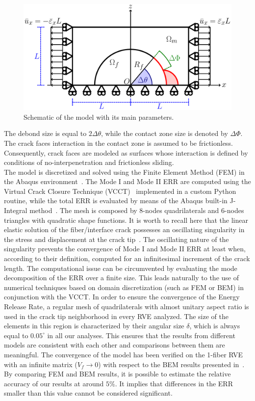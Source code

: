 \begin{figure}[!htb]
\centering
  \includegraphics[width=\textwidth]{paperD/RUC.pdf}
\caption{Schematic of the model with its main parameters.}\label{paperD:fig:ruc}
\end{figure}

The debond size is equal to $2\Delta\theta$, while the contact zone size is denoted by $\Delta\Phi$. The crack faces interaction in the contact zone is assumed to be frictionless. Consequently, crack faces are modeled as surfaces whose interaction is defined by conditions of no-interpenetration and frictionless sliding.\\
The model is discretized and solved using the Finite Element Method (FEM) in the Abaqus environment~\cite{abq12}. The Mode I and Mode II ERR are computed using the Virtual Crack Closure Technique (VCCT)~\cite{Krueger2004} implemented in a custom Python routine, while the total ERR is evaluated by means of the Abaqus built-in J-Integral method~\cite{Rice1968}. The mesh is composed by 8-nodes quadrilaterals and 6-nodes triangles with quadratic shape functions. It is worth to recall here that the linear elastic solution of the fiber/interface crack possesses an oscillating singularity in the stress and displacement at the crack tip~\cite{England1966,Perlman1967,Toya1974}. The oscillating nature of the singularity prevents the convergence of Mode I and Mode II ERR at least when, according to their definition, computed for an infinitesimal increment of the crack length. The computational issue can be circumvented by evaluating the mode decomposition of the ERR over a finite size. This leads naturally to the use of numerical techniques based on domain discretization (such as FEM or BEM) in conjunction with the VCCT. In order to ensure the convergence of the Energy Release Rate, a regular mesh of quadrilaterals with almost unitary aspect ratio is used in the crack tip neighborhood in every RVE analyzed. The size of the elements in this region is characterized by their angular size $\delta$, which is always equal to $0.05^{\circ}$ in all our analyses. This ensures that the results from different models are consistent with each other and comparisons between them are meaningful. The convergence of the model has been verified on the 1-fiber RVE with an infinite matrix ($V_{f}\rightarrow0$) with respect to the BEM results presented in~\cite{Sandino2016}. By comparing FEM and BEM results, it is possible to estimate the relative accuracy of our results at around $5\%$. It implies that differences in the ERR smaller than this value cannot be considered significant.

